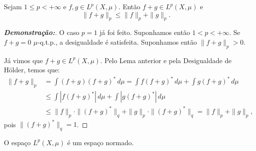 \begin{theorem*}
Sejam $1 \le p < +\infty$ e $f, g \in L^p(X, \mu)$. Então $f+g \in L^p(X, \mu)$ e
$$ \|f+g\|_p \le \|f\|_p + \|g\|_p. $$
\end{theorem*}

\begin{proof}[\textbf{Demonstração:}]
O caso $p=1$ já foi feito. Suponhamos então $1 < p < +\infty$. Se $f+g = 0$ $\mu$-q.t.p., a desigualdade é satisfeita. Suponhamos então $\|f+g\|_p > 0$.

Já vimos que $f+g \in L^p(X, \mu)$. Pelo Lema anterior e pela Desigualdade de Hölder, temos que:
\begin{align*}
    \|f+g\|_p &= \int (f+g)(f+g)^* \, d\mu = \int f(f+g)^* \, d\mu + \int g(f+g)^* \, d\mu \\
    &\le \int |f(f+g)^*| \, d\mu + \int |g(f+g)^*| \, d\mu \\
    &\le \|f\|_p \cdot \|(f+g)^*\|_q + \|g\|_p \cdot \|(f+g)^*\|_q = \|f\|_p + \|g\|_p,
\end{align*}
pois $\|(f+g)^*\|_q = 1$.
\end{proof}

\begin{theorem*}{}
O espaço $L^p(X, \mu)$ é um espaço normado.
\end{theorem*}


